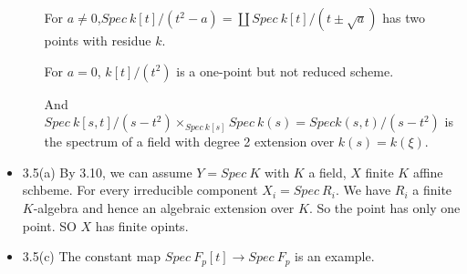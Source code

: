 \documentclass[12pt]{article}
\begin{document}
\begin{itemize}
\begin{itemize}
For $a \neq 0$,$Spec  \ k[t]/(t^2-a)= \coprod Spec  \ k[t]/(t \pm \sqrt{a})$ has two points with residue $k$.

For $a=0$, $ k[t]/(t^2)$ is a one-point but not reduced scheme.

And $Spec \ k[s,t]/(s-t^2) \times _{Spec \  k[s]} Spec  \ k(s)= Spec  k(s,t)/(s-t^2)$ is the spectrum of a field with degree 2 extension over $k(s)=k(\xi)$.
\end{itemize}
\item 3.5(a) By 3.10, we can assume $Y=Spec \  K$ with $K$ a field, $X$ finite $K$ affine schbeme. For every irreducible component $X_i=Spec  \ R_i$. We have $R_i$ a finite $K$-algebra and hence an algebraic extension over $K$. So the point has only one point. SO $X$ has finite opints.
\item 3.5(c) The constant map $Spec \  F_p[t] \to Spec  \ F_p$ is an example.

\end{itemize} 
 
\end{document}
